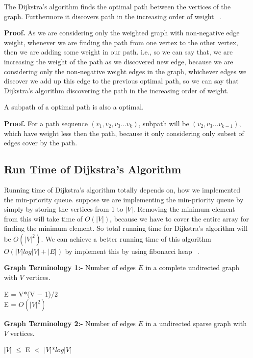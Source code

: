  \begin{theorem}
  The Dijkstra's algorithm finds the optimal path between the vertices of the graph. Furthermore it discovers path in the increasing order of weight ~\cite{dijktra}.
 \end{theorem}
 \textbf{Proof.} As we are considering only the weighted graph with non-negative edge weight, whenever we are finding the path from one vertex to the other vertex, then we are adding some weight in our path. i.e., so we can say that, we are increasing the weight of the path as we discovered new edge, because we are considering only the non-negative weight edges in the graph, whichever edges we discover we add up this edge to the previous optimal path, so we can say that Dijkstra's algorithm discovering the path in the increasing order of weight.
\begin{lemma}
A subpath of a optimal path is also a optimal.
\end{lemma}
\textbf{Proof.} For a path sequence $(v_1,v_2,v_3 \dots v_k)$, subpath will be $(v_2,v_3 \dots v_{k-1})$, which have weight less then the path, because it only considering only subset of edges cover by the path.
 \subsection{Run Time of Dijkstra's Algorithm}
 Running time of Dijkstra's algorithm totally depends on, how we implemented the min-priority queue. suppose we are implementing the min-priority queue by simply by storing the vertices from 1 to $|V|$. Removing the minimum element from this will take time of 
 $O(|V|)$, because we have to cover the entire array for finding the minimum element. So total running time for Dijkstra's algorithm will be $O(|V|^2)$. We can achieve a better running time of this algorithm $O(|V|log|V| + |E|)$ by implement this by using fibonacci heap ~\cite{cormen}.    

\textbf{Graph Terminology 1:-} Number of edges $E$ in a complete undirected graph with $V$ vertices.
\begin{center}
 E = V$*$(V $-$ 1)$/$2\\
 E = $O(|V|^2)$
\end{center} 
\textbf{Graph Terminology 2:-} Number of edges $E$ in a undirected sparse graph with $V$ vertices.
\begin{center}
 $|V|$ $\leq$ E $<$ $|V|$*$log|V|$
\end{center} 
